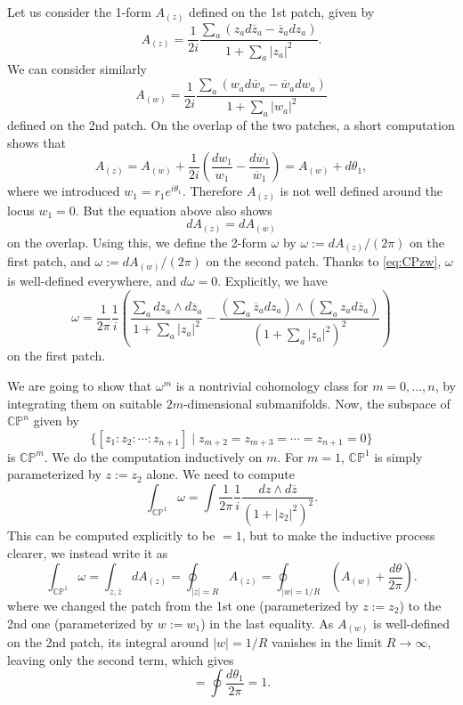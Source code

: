 \documentclass[12pt]{article}
\numberwithin{equation}{section}
\theoremstyle{remark}
\let\bar\overline
\def\CP{\mathbb{CP}}
\begin{document}
Let us consider the 1-form $A_{(z)}$ defined on the 1st patch, given by \begin{equation}
A_{(z)} =  \frac{1}{2i} \frac{\sum_a (z_a d\bar z_a-\bar z_a dz_a)}{1+\sum_a |z_a|^2}.
\label{eq:CPnConn1}
\end{equation} 
We can consider similarly \begin{equation}
A_{(w)} =  \frac{1}{2i} \frac{\sum_a (w_a d\bar w_a-\bar w_a dw_a)}{1+\sum_a |w_a|^2}
\label{eq:CPnConn2}
\end{equation}  defined on the 2nd patch.
On the overlap of the two patches, a short computation shows that \begin{equation}
A_{(z)}=A_{(w)} + \frac{1}{2i} (\frac{dw_1}{w_1}-\frac{d\bar w_1}{\bar w_1})
=A_{(w)} + {d\theta_1},
\label{eq:CPnConn3}
\end{equation}
where we introduced $w_1=r_1 e^{i\theta_1}$.  
Therefore $A_{(z)}$ is not well defined around the locus $w_1=0$.
But the equation above also shows \begin{equation}
dA_{(z)}=dA_{(w)} \label{eq:CPzw}
\end{equation} on the overlap. 
Using this, we define the 2-form $\omega$ by $
\omega := dA_{(z)} /(2\pi)
$ on the first patch,
and $
\omega:=dA_{(w)}/(2\pi)
$ on the second patch. 
Thanks to \eqref{eq:CPzw}, $\omega$ is well-defined everywhere, and $d\omega=0$.
Explicitly, we have
\begin{equation}
\omega = \frac{1}{2\pi}\frac{1}{i} \left(
\frac{\sum_a dz_a \wedge d\bar z_a}{1+\sum_a |z_a|^2}
-\frac{(\sum_a \bar z_a dz_a) \wedge (\sum_a z_a d\bar z_a)}{(1+\sum_a |z_a|^2)^2}
\right)
\label{eq:CPnConn4}
\end{equation} on the first patch.

We are going to show that $\omega^m$ is a nontrivial cohomology class for $m=0,\ldots, n$, by integrating them on suitable $2m$-dimensional submanifolds.
Now, the subspace of $\CP^n$ given by \begin{equation}
\{ [z_1:z_2:\cdots:z_{n+1}] \mid  z_{m+2}=z_{m+3}=\cdots=z_{n+1}=0\} 
\end{equation} is  $\CP^m$.
We do the computation inductively on $m$.
For $m=1$, $\CP^1$ is simply parameterized by $z:=z_2$ alone. We need to compute \begin{equation}
\int_{\CP^1} \omega = \int \frac1{2\pi} \frac{1}{i} \frac{dz \wedge d\bar z}{(1+|z_2|^2)^2} .
\end{equation} This can be computed explicitly to be $=1$, 
but to make the inductive process clearer, we instead write it as \begin{equation}
\int_{\CP^1} \omega= \int_{z,\bar z} dA_{(z)} = \oint_{|z|=R} A_{(z)}
= \oint_{|w|=1/R} (A_{(w)} + \frac{d\theta}{2\pi}).
\end{equation} where we changed the patch from the 1st one (parameterized by $z:=z_2$)  to 
the 2nd one (parameterized by $w:=w_1$) in the last equality.
As $A_{(w)}$ is well-defined on the 2nd patch, its integral around $|w|=1/R$ vanishes in the limit $R\to \infty$, leaving only the second term, which gives \begin{equation}
= \oint \frac{d\theta_1}{2\pi} = 1.
\end{equation}
\end{document}
